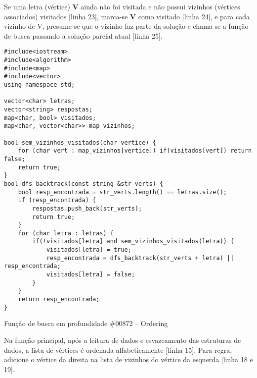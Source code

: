 \documentclass[a4paper,12pt]{scrartcl}
\begin{document}
Se uma letra (vértice) \textbf{V} ainda não foi visitada e não possui vizinhos (vértices associados) visitados [linha 23], marca-se \textbf{V} como visitado [linha 24], e para cada vizinho de V, presume-se que o vizinho faz parte da solução e chama-se a função de busca passando a solução parcial atual [linha 25].

\begin{listing}[H]
\begin{verbatim}
#include<iostream>
#include<algorithm>
#include<map>
#include<vector>
using namespace std;

vector<char> letras;
vector<string> respostas;
map<char, bool> visitados;
map<char, vector<char>> map_vizinhos;

bool sem_vizinhos_visitados(char vertice) {
    for (char vert : map_vizinhos[vertice]) if(visitados[vert]) return false;
    return true;
}
bool dfs_backtrack(const string &str_verts) {
    bool resp_encontrada = str_verts.length() == letras.size();
    if (resp_encontrada) {
        respostas.push_back(str_verts);
        return true;
    }
    for (char letra : letras) {
        if(!visitados[letra] and sem_vizinhos_visitados(letra)) {
            visitados[letra] = true;
            resp_encontrada = dfs_backtrack(str_verts + letra) || resp_encontrada;
            visitados[letra] = false;
        }
    }
    return resp_encontrada;
}
\end{verbatim}
\caption{\footnotesize{Função de busca em profundidade \#00872 – Ordering}}
\end{listing}

Na função principal, após a leitura de dados e esvazeamento das estruturas de dados, a lista de vértices é ordenada alfabeticamente [linha 15]. Para regra, adicione o vértice da direita na lista de vizinhos do vértice da esquerda [linha 18 e 19].
\end{document}
